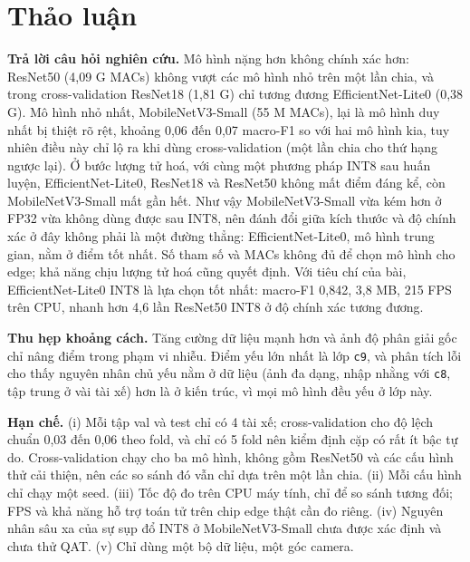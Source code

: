 \documentclass[10pt,a4paper,twocolumn]{article}
\newcommand{\cls}[1]{\texttt{#1}}
\begin{document}
\section{Thảo luận}
\textbf{Trả lời câu hỏi nghiên cứu.} Mô hình nặng hơn không chính xác hơn: ResNet50 (4,09 G MACs) không vượt các mô hình nhỏ trên một lần chia, và trong cross-validation ResNet18 (1,81 G) chỉ tương đương EfficientNet-Lite0 (0,38 G). Mô hình nhỏ nhất, MobileNetV3-Small (55 M MACs), lại là mô hình duy nhất bị thiệt rõ rệt, khoảng 0,06 đến 0,07 macro-F1 so với hai mô hình kia, tuy nhiên điều này chỉ lộ ra khi dùng cross-validation (một lần chia cho thứ hạng ngược lại). Ở bước lượng tử hoá, với cùng một phương pháp INT8 sau huấn luyện, EfficientNet-Lite0, ResNet18 và ResNet50 không mất điểm đáng kể, còn MobileNetV3-Small mất gần hết. Như vậy MobileNetV3-Small vừa kém hơn ở FP32 vừa không dùng được sau INT8, nên đánh đổi giữa kích thước và độ chính xác ở đây không phải là một đường thẳng: EfficientNet-Lite0, mô hình trung gian, nằm ở điểm tốt nhất. Số tham số và MACs không đủ để chọn mô hình cho edge; khả năng chịu lượng tử hoá cũng quyết định. Với tiêu chí của bài, EfficientNet-Lite0 INT8 là lựa chọn tốt nhất: macro-F1 0,842, 3,8 MB, 215 FPS trên CPU, nhanh hơn 4,6 lần ResNet50 INT8 ở độ chính xác tương đương.

\textbf{Thu hẹp khoảng cách.} Tăng cường dữ liệu mạnh hơn và ảnh độ phân giải gốc chỉ nâng điểm trong phạm vi nhiễu. Điểm yếu lớn nhất là lớp \cls{c9}, và phân tích lỗi cho thấy nguyên nhân chủ yếu nằm ở dữ liệu (ảnh đa dạng, nhập nhằng với \cls{c8}, tập trung ở vài tài xế) hơn là ở kiến trúc, vì mọi mô hình đều yếu ở lớp này.

\textbf{Hạn chế.} (i) Mỗi tập val và test chỉ có 4 tài xế; cross-validation cho độ lệch chuẩn 0,03 đến 0,06 theo fold, và chỉ có 5 fold nên kiểm định cặp có rất ít bậc tự do. Cross-validation chạy cho ba mô hình, không gồm ResNet50 và các cấu hình thử cải thiện, nên các so sánh đó vẫn chỉ dựa trên một lần chia. (ii) Mỗi cấu hình chỉ chạy một seed. (iii) Tốc độ đo trên CPU máy tính, chỉ để so sánh tương đối; FPS và khả năng hỗ trợ toán tử trên chip edge thật cần đo riêng. (iv) Nguyên nhân sâu xa của sự sụp đổ INT8 ở MobileNetV3-Small chưa được xác định và chưa thử QAT. (v) Chỉ dùng một bộ dữ liệu, một góc camera.

\end{document}
